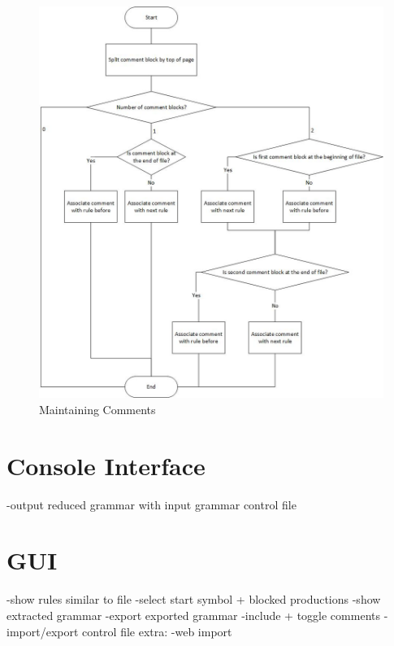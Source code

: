 \begin{figure}[H]
\centering
\includegraphics[width=1\textwidth]{images/maintainingComments.jpg}
\caption{Maintaining Comments}
\label{fig:comments}
\end{figure}

\section{Console Interface}\label{sec:Console Interface}
-output reduced grammar with input grammar control file 
\section{GUI}\label{sec:ConceptGUI}
-show rules similar to file
-select start symbol + blocked productions
-show extracted grammar
-export exported grammar
-include + toggle comments
-import/export control file
extra:
-web import


